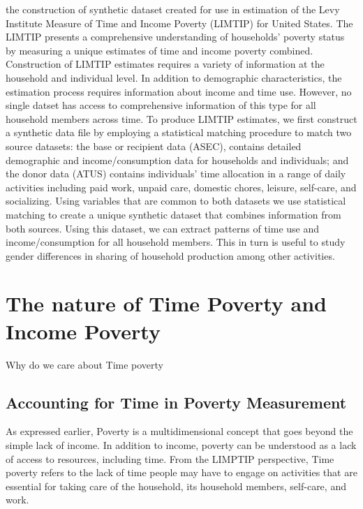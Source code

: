 \documentclass[
  11pt,
]{article}
\begin{document}
the construction of synthetic dataset created for use in estimation of
the Levy Institute Measure of Time and Income Poverty (LIMTIP) for
United States. The LIMTIP presents a comprehensive understanding of
households' poverty status by measuring a unique estimates of time and
income poverty combined. Construction of LIMTIP estimates requires a
variety of information at the household and individual level. In
addition to demographic characteristics, the estimation process requires
information about income and time use. However, no single datset has
access to comprehensive information of this type for all household
members across time. To produce LIMTIP estimates, we first construct a
synthetic data file by employing a statistical matching procedure to
match two source datasets: the base or recipient data (ASEC), contains
detailed demographic and income/consumption data for households and
individuals; and the donor data (ATUS) contains individuals' time
allocation in a range of daily activities including paid work, unpaid
care, domestic chores, leisure, self-care, and socializing. Using
variables that are common to both datasets we use statistical matching
to create a unique synthetic dataset that combines information from both
sources. Using this dataset, we can extract patterns of time use and
income/consumption for all household members. This in turn is useful to
study gender differences in sharing of household production among other
activities.

\section{The nature of Time Poverty and Income
Poverty}\label{sec-timepoverty}

Why do we care about Time poverty

\subsection{Accounting for Time in Poverty
Measurement}\label{accounting-for-time-in-poverty-measurement}

As expressed earlier, Poverty is a multidimensional concept that goes
beyond the simple lack of income. In addition to income, poverty can be
understood as a lack of access to resources, including time. From the
LIMPTIP perspective, Time poverty refers to the lack of time people may
have to engage on activities that are essential for taking care of the
household, its household members, self-care, and work.
\end{document}
